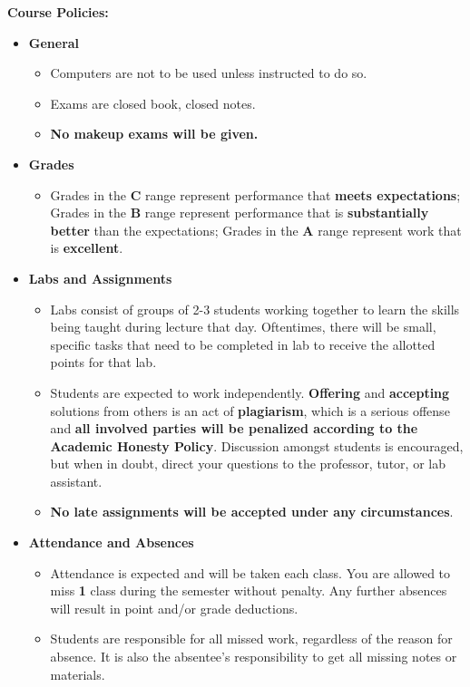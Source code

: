 \documentclass[11pt]{article}
\begin{document}
\textbf {Course Policies:}
\begin{itemize}
	\item \textbf {General}
		\begin{itemize}
			\item Computers are not to be used unless instructed to do so.
			\item Exams are closed book, closed notes.
			\item \textbf {No makeup exams will be given.}
		\end{itemize}
	\item \textbf {Grades}
		\begin{itemize}
			\item Grades in the \textbf{C} range represent performance that \textbf{meets expectations}; Grades in the \textbf{B} range represent performance that is \textbf{substantially better} than the expectations; Grades in the \textbf{A} range represent work that is \textbf{excellent}.
		\end{itemize}
	\item \textbf {Labs and Assignments}
		\begin{itemize}
		\item Labs consist of groups of 2-3 students working together to learn the skills being taught during lecture that day. Oftentimes, there will be small, specific tasks that need to be completed in lab to receive the allotted points for that lab.
			\item Students are expected to work independently. \textbf{Offering} and \textbf{accepting} solutions from others is an act of \textbf{plagiarism}, which is a serious offense and \textbf{all involved parties will be penalized according to the Academic Honesty Policy}. Discussion amongst students is encouraged, but when in doubt, direct your questions to the professor, tutor, or lab assistant.
			\item \textbf{No late assignments will be accepted under any circumstances}.
		\end{itemize}
	\item \textbf{Attendance and Absences}
		\begin{itemize}
			\item Attendance is expected and will be taken each class. You are allowed to miss \textbf{1} class during the semester without penalty. Any further absences will result in point and/or grade deductions.
			\item Students are responsible for all missed work, regardless of the reason for absence. It is also the absentee's responsibility to get all missing notes or materials. 
		\end{itemize}
\end{itemize}
\end{document}
